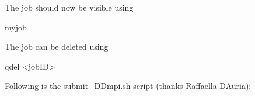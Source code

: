 {\bfseries{The job should now be visible using \begin{DoxyVerb}myjob
\end{DoxyVerb}
}}

{\bfseries{The job can be deleted using \begin{DoxyVerb}qdel <jobID>
\end{DoxyVerb}
}}

{\bfseries{Following is the submit\+\_\+\+D\+Dmpi.\+sh script (thanks Raffaella D\textquotesingle{}Auria)\+: 
\begin{DoxyCodeInclude}{0}
\end{DoxyCodeInclude}
 }}